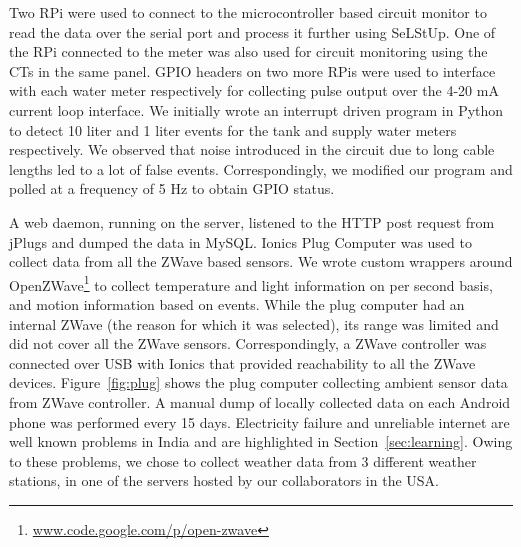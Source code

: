 \documentclass[10pt]{sensys-proc}
\newcommand{\figref}[1]{Figure~\ref{#1}}
\newcommand{\secref}[1]{Section~\ref{#1}}
\newcommand{\paradigm}{Sense-Local Store-Upload}
\newcommand{\selstup}{SeLStUp}
\begin{document}

Two RPi were used to connect to the microcontroller based circuit monitor to read the data over the serial port and process it further using \selstup. One of the RPi connected to the meter was also used for circuit monitoring using the CTs in the same panel. GPIO headers on two more RPis were used to interface with each water meter respectively for collecting pulse output over the 4-20 mA current loop interface. We initially wrote an interrupt driven program in Python to detect 10 liter and 1 liter events for the tank and supply water meters respectively. We observed that noise introduced in the circuit due to long cable lengths led to a lot of false events. Correspondingly, we modified our program and polled at a frequency of 5 Hz to obtain GPIO status.%

A web daemon, running on the server, listened to the HTTP post request from jPlugs and dumped the data in MySQL. Ionics Plug Computer was used to collect data from all the ZWave based sensors. We wrote custom wrappers around OpenZWave\footnote{\url{www.code.google.com/p/open-zwave}} to collect temperature and light information on per second basis, and motion information based on events. While the plug computer had an internal ZWave (the reason for which it was selected), its range was limited and did not cover all the ZWave sensors. Correspondingly, a ZWave controller was connected over USB with Ionics that provided reachability to all the ZWave devices. %
\figref{fig:plug} shows the plug computer collecting ambient sensor data from ZWave controller. A manual dump of locally collected data on each Android phone was performed every 15 days. Electricity failure and unreliable internet are well known problems in India and are highlighted in \secref{sec:learning}. Owing to these problems, we chose to collect weather data from 3 different weather stations, in one of the servers hosted by our collaborators in the USA. 
\end{document}
